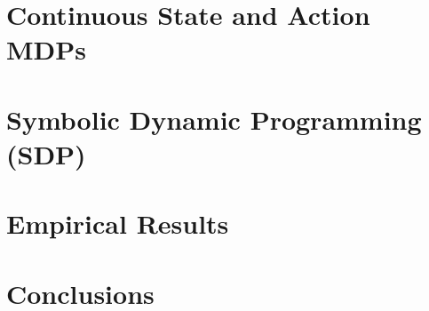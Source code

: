 \documentclass[letterpaper]{article}
\begin{document}
\section{Continuous State and Action MDPs}



\section{Symbolic Dynamic Programming (SDP)}



\section{Empirical Results}



\section{Conclusions}





\end{document}
